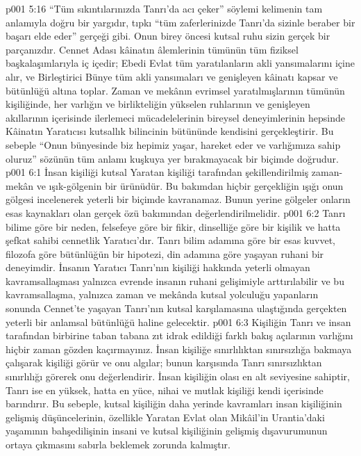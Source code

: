 \vs p001 5:16 “Tüm sıkıntılarınızda Tanrı’da acı çeker” söylemi kelimenin tam anlamıyla doğru bir yargıdır, tıpkı “tüm zaferlerinizde Tanrı’da sizinle beraber bir başarı elde eder” gerçeği gibi. Onun birey öncesi kutsal ruhu sizin gerçek bir parçanızdır. Cennet Adası kâinatın âlemlerinin tümünün tüm fiziksel başkalaşımlarıyla iç içedir; Ebedi Evlat tüm yaratılanların akli yansımalarını içine alır, ve Birleştirici Bünye tüm akli yansımaları ve genişleyen kâinatı kapsar ve bütünlüğü altına toplar. Zaman ve mekânın evrimsel yaratılmışlarının tümünün kişiliğinde, her varlığın ve birlikteliğin yükselen ruhlarının ve genişleyen akıllarının içerisinde ilerlemeci mücadelelerinin bireysel deneyimlerinin hepsinde Kâinatın Yaratıcısı kutsallık bilincinin bütününde kendisini gerçekleştirir. Bu sebeple “Onun bünyesinde biz hepimiz yaşar, hareket eder ve varlığımıza sahip oluruz” sözünün tüm anlamı kuşkuya yer bırakmayacak bir biçimde doğrudur.
\vs p001 6:1 İnsan kişiliği kutsal Yaratan kişiliği tarafından şekillendirilmiş zaman\hyp{}mekân ve ışık\hyp{}gölgenin bir ürünüdür. Bu bakımdan hiçbir gerçekliğin ışığı onun gölgesi incelenerek yeterli bir biçimde kavranamaz. Bunun yerine gölgeler onların esas kaynakları olan gerçek özü bakımından değerlendirilmelidir.
\vs p001 6:2 Tanrı bilime göre bir neden, felsefeye göre bir fikir, dinselliğe göre bir kişilik ve hatta şefkat sahibi cennetlik Yaratıcı’dır. Tanrı bilim adamına göre bir esas kuvvet, filozofa göre bütünlüğün bir hipotezi, din adamına göre yaşayan ruhani bir deneyimdir. İnsanın Yaratıcı Tanrı’nın kişiliği hakkında yeterli olmayan kavramsallaşması yalnızca evrende insanın ruhani gelişimiyle arttırılabilir ve bu kavramsallaşma, yalnızca zaman ve mekânda kutsal yolculuğu yapanların sonunda Cennet’te yaşayan Tanrı’nın kutsal karşılamasına ulaştığında gerçekten yeterli bir anlamsal bütünlüğü haline gelecektir.
\vs p001 6:3 Kişiliğin Tanrı ve insan tarafından birbirine taban tabana zıt idrak edildiği farklı bakış açılarının varlığını hiçbir zaman gözden kaçırmayınız. İnsan kişiliğe sınırlılıktan sınırsızlığa bakmaya çalışarak kişiliği görür ve onu algılar; bunun karşısında Tanrı sınırsızlıktan sınırlılığı görerek onu değerlendirir. İnsan kişiliğin olası en alt seviyesine sahiptir, Tanrı ise en yüksek, hatta en yüce, nihai ve mutlak kişiliği kendi içerisinde barındırır. Bu sebeple, kutsal kişiliğin daha yerinde kavramları insan kişiliğinin gelişmiş düşüncelerinin, özellikle Yaratan Evlat olan Mikâil’in Urantia’daki yaşamının bahşedilişinin insani ve kutsal kişiliğinin gelişmiş dışavurumunun ortaya çıkmasını sabırla beklemek zorunda kalmıştır.
